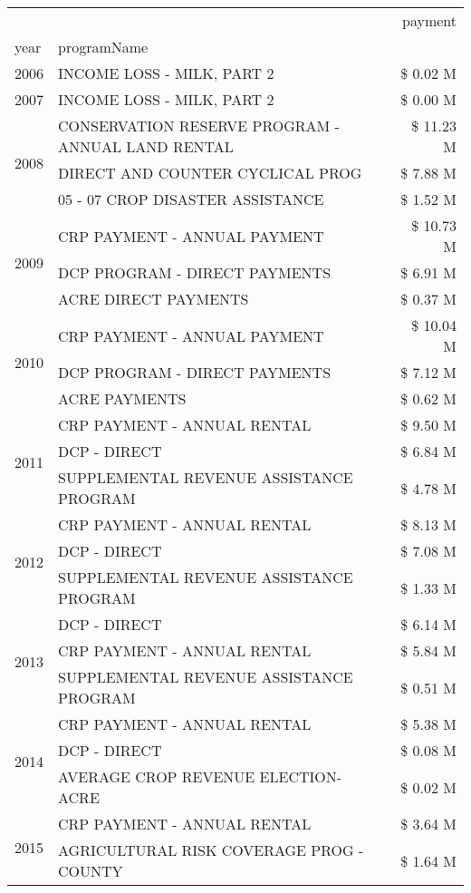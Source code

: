 \begin{tabular}{llr}
\toprule
 &  & payment \\
year & programName &  \\
\midrule
2006 & INCOME LOSS - MILK, PART 2 & \$ 0.02 M \\
\cline{1-3}
2007 & INCOME LOSS - MILK, PART 2 & \$ 0.00 M \\
\cline{1-3}
\multirow[t]{3}{*}{2008} & CONSERVATION RESERVE PROGRAM - ANNUAL LAND RENTAL & \$ 11.23 M \\
 & DIRECT AND COUNTER CYCLICAL PROG & \$ 7.88 M \\
 & 05 - 07 CROP DISASTER ASSISTANCE & \$ 1.52 M \\
\cline{1-3}
\multirow[t]{3}{*}{2009} & CRP PAYMENT - ANNUAL PAYMENT & \$ 10.73 M \\
 & DCP PROGRAM - DIRECT PAYMENTS & \$ 6.91 M \\
 & ACRE DIRECT PAYMENTS & \$ 0.37 M \\
\cline{1-3}
\multirow[t]{3}{*}{2010} & CRP PAYMENT - ANNUAL PAYMENT & \$ 10.04 M \\
 & DCP PROGRAM - DIRECT PAYMENTS & \$ 7.12 M \\
 & ACRE PAYMENTS & \$ 0.62 M \\
\cline{1-3}
\multirow[t]{3}{*}{2011} & CRP PAYMENT - ANNUAL RENTAL & \$ 9.50 M \\
 & DCP - DIRECT & \$ 6.84 M \\
 & SUPPLEMENTAL REVENUE ASSISTANCE PROGRAM & \$ 4.78 M \\
\cline{1-3}
\multirow[t]{3}{*}{2012} & CRP PAYMENT - ANNUAL RENTAL & \$ 8.13 M \\
 & DCP - DIRECT & \$ 7.08 M \\
 & SUPPLEMENTAL REVENUE ASSISTANCE PROGRAM & \$ 1.33 M \\
\cline{1-3}
\multirow[t]{3}{*}{2013} & DCP - DIRECT & \$ 6.14 M \\
 & CRP PAYMENT - ANNUAL RENTAL & \$ 5.84 M \\
 & SUPPLEMENTAL REVENUE ASSISTANCE PROGRAM & \$ 0.51 M \\
\cline{1-3}
\multirow[t]{3}{*}{2014} & CRP PAYMENT - ANNUAL RENTAL & \$ 5.38 M \\
 & DCP - DIRECT & \$ 0.08 M \\
 & AVERAGE CROP REVENUE ELECTION-ACRE & \$ 0.02 M \\
\cline{1-3}
\multirow[t]{3}{*}{2015} & CRP PAYMENT - ANNUAL RENTAL & \$ 3.64 M \\
 & AGRICULTURAL RISK COVERAGE PROG - COUNTY & \$ 1.64 M \\

\end{tabular}
